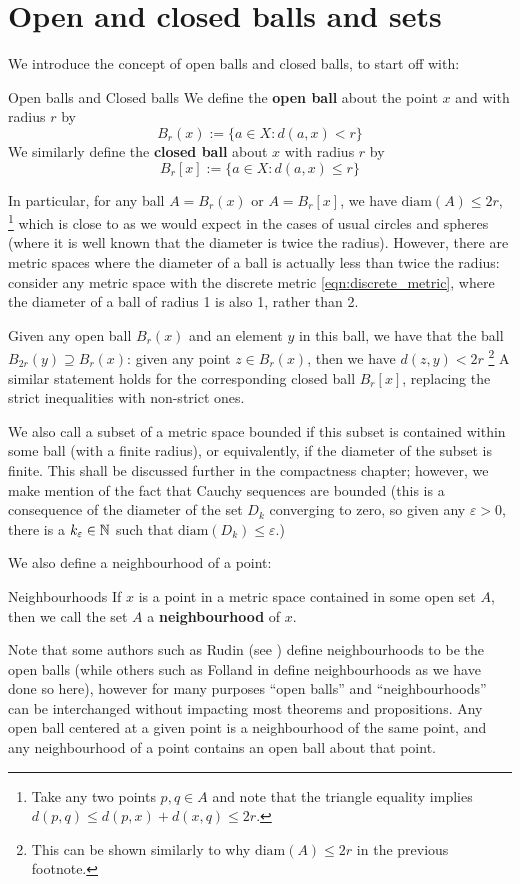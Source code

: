 \section{Open and closed balls and sets}

We introduce the concept of open balls and closed balls, to start off with:
\begin{bdefin}{Open balls and Closed balls}{}
We define the \textbf{open ball} about the point $x$ and with radius $r$ by
\[ B_{r}(x) := \{a \in X : d(a,x) < r\} \]
We similarly define the \textbf{closed ball} about $x$ with radius $r$ by
\[ B_{r}[x] := \{a \in X : d(a,x) \leq r\}  \]
\end{bdefin}

In particular, for any ball $A = B_{r}(x)$ or $A = B_{r}[x]$, we have $\text{diam}(A) \leq 2r$, \footnote{Take any two points $p,q \in A$ and note that the triangle equality implies $d(p,q) \leq d(p,x) + d(x,q) \leq 2r$.} which is close to as we would expect in the cases of usual circles and spheres (where it is well known that the diameter is twice the radius). However, there are metric spaces where the diameter of a ball is actually less than twice the radius: consider any metric space with the discrete metric \eqref{eqn:discrete_metric}, where the diameter of a ball of radius 1 is also 1, rather than 2.

Given any open ball $B_{r}(x)$ and an element $y$ in this ball, we have that the ball $B_{2r}(y) \supseteq B_{r}(x)$: given any point \mbox{$z\in B_{r}(x)$}, then we have $d(z,y) < 2r$ \footnote{This can be shown similarly to why \mbox{$\text{diam}(A) \leq 2r$} in the previous footnote.}
A similar statement holds for the corresponding closed ball $B_{r}[x]$, replacing the strict inequalities with non-strict ones.

We also call a subset of a metric space bounded if this subset is contained within some ball (with a finite radius), or equivalently, if the diameter of the subset is finite. This shall be discussed further in the compactness chapter; however, we make mention of the fact that Cauchy sequences are bounded (this is a consequence of the diameter of the set $D_{k}$ converging to zero, so given any $\varepsilon>0$, there is a \mbox{$k_{\varepsilon}\in \mathbb{N}$} such that \mbox{$\text{diam}(D_{k})\leq \varepsilon$.}) 

We also define a neighbourhood of a point:

\begin{bdefin}{Neighbourhoods}{}
If $x$ is a point in a metric space contained in some open set $A$, then we call the set $A$ a \textbf{neighbourhood} of $x$.
\end{bdefin}
Note that some authors such as Rudin (see \cite{rudin}) define neighbourhoods to be the open balls (while others such as Folland in \cite{folland} define neighbourhoods as we have done so here), however for many purposes “open balls” and “neighbourhoods” can be interchanged without impacting most theorems and propositions. Any open ball centered at a given point is a neighbourhood of the same point, and any neighbourhood of a point contains an open ball about that point.

